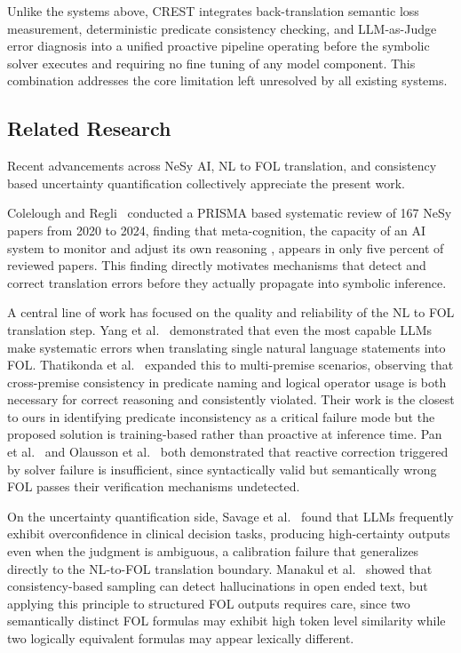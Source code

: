 Unlike the systems above, CREST integrates back-translation semantic loss measurement, deterministic predicate consistency checking, and LLM-as-Judge error diagnosis into a unified proactive pipeline operating before the symbolic solver executes and requiring no fine tuning of any model component. This combination addresses the core limitation left unresolved by all existing systems.

\subsection{Related Research}

Recent advancements across NeSy AI, NL to FOL translation, and consistency based uncertainty quantification collectively appreciate the present work.

Colelough and Regli~\cite{colelough2025nesyreview} conducted a PRISMA based systematic review of 167 NeSy papers from 2020 to 2024, finding that meta-cognition, the capacity of an AI system to monitor and adjust its own reasoning , appears in only five percent of reviewed papers. This finding directly motivates mechanisms that detect and correct translation errors before they actually propagate into symbolic inference.

A central line of work has focused on the quality and reliability of the NL to FOL translation step. Yang et al.~\cite{yang2024harnessing} demonstrated that even the most capable LLMs make systematic errors when translating single natural language statements into FOL. Thatikonda et al.~\cite{thatikonda2024strategies} expanded this to multi-premise scenarios, observing that cross-premise consistency in predicate naming and logical operator usage is both necessary for correct reasoning and consistently violated. Their work is the closest to ours in identifying predicate inconsistency as a critical failure mode but the proposed solution is training-based rather than proactive at inference time. Pan et al.~\cite{pan2023logiclm} and Olausson et al.~\cite{olausson2023linc} both demonstrated that reactive correction triggered by solver failure is insufficient, since syntactically valid but semantically wrong FOL passes their verification mechanisms undetected.

On the uncertainty quantification side, Savage et al.~\cite{savage2024do} found that LLMs frequently exhibit overconfidence in clinical decision tasks, producing high-certainty outputs even when the judgment is ambiguous,  a calibration failure that generalizes directly to the NL-to-FOL translation boundary. Manakul et al.~\cite{manakul2023selfcheck} showed that consistency-based sampling can detect hallucinations in open ended text, but applying this principle to structured FOL outputs requires care, since two semantically distinct FOL formulas may exhibit high token level similarity while two logically equivalent formulas may appear lexically different.

